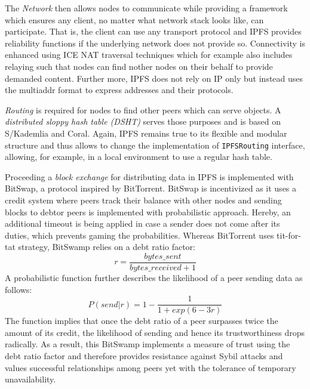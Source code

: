 \documentclass[conference]{IEEEtran}
\begin{document}
The \textit{Network} then allows nodes to communicate while providing a framework which ensures any client, no matter what network stack looks like, can participate.
That is, the client can use any transport protocol and IPFS provides reliability functions if the underlying network does not provide so. 
Connectivity is enhanced using ICE NAT traversal techniques \cite{ice-nat} which for example also includes relaying such that nodes can find nother nodes on their behalf to provide demanded content.
Further more, IPFS does not rely on IP only but instead uses the multiaddr\cite{multiaddr} format to express addresses and their protocols.

\textit{Routing} is required for nodes to find other peers which can serve objects.
A \textit{distributed sloppy hash table (DSHT)}\cite{dsht} serves those purposes and is based on S/Kademlia\cite{kademlia} and Coral\cite{coral}. 
Again, IPFS remains true to its flexible and modular structure and thus allows to change the implementation of \texttt{IPFSRouting} interface, allowing, for example, in a local environment to use a regular hash table. \cite{ipfs-whitepaper}

Proceeding a \textit{block exchange} for distributing data in IPFS is implemented with BitSwap\cite{bitswap}, a protocol inspired by BitTorrent\cite{bittorrent}.
BitSwap is incentivized as it uses a credit system where peers track their balance with other nodes and sending blocks to debtor peers is implemented with probabilistic approach.
Hereby, an additional timeout is being applied in case a sender does not come after its duties, which prevents gaming the probabilities.
Whereas BitTorrent uses tit-for-tat strategy, BitSwamp relies on a debt ratio factor: \[r=\frac{bytes\_sent}{bytes\_received+1}\]
A probabilistic function further describes the likelihood of a peer sending data as follows:
\[P(send|r)= 1-\frac{1}{1 + exp(6-3r)}\]
The function implies that once the debt ratio of a peer surpasses twice the amount of its credit, the likelihood of sending and hence its trustworthiness drops radically.
As a result, this BitSwamp implements a measure of trust using the debt ratio factor and therefore provides resistance against Sybil attacks and values successful relationships among peers yet with the tolerance of temporary unavailability. \cite{ipfs-whitepaper}
\end{document}
